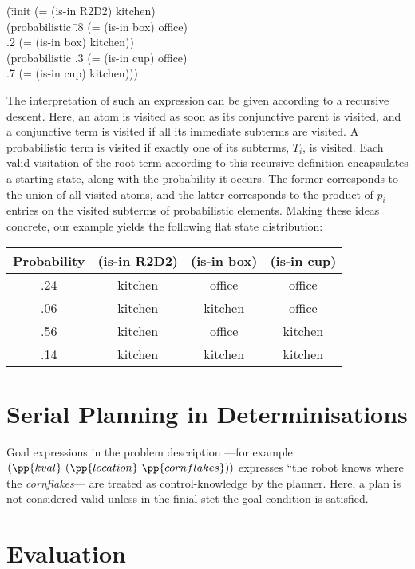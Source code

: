 \documentclass[letterpaper]{article}
\begin{document}
\small{
\begin{tabtt}
(\=:init (= (is-in R2D2) kitchen) \+ \\
       (probabilistic \=.8 (= (is-in box) office)  \\
		      \>.2 (= (is-in box) kitchen)) \\
       (probabilistic .3 (= (is-in cup) office)  \\
		      \>.7 (= (is-in cup) kitchen))) \\
\end{tabtt}
}

\noindent The interpretation of such an expression can be given
according to a recursive descent. Here, an atom is visited as soon as
its conjunctive parent is visited, and a conjunctive term is visited
if all its immediate subterms are visited. A probabilistic term is
visited if exactly one of its subterms, $T_i$, is visited. Each valid
visitation of the root term according to this recursive definition
encapsulates a starting state, along with the probability it
occurs. The former corresponds to the union of all visited atoms, and
the latter corresponds to the product of $p_i$ entries on the visited
subterms of probabilistic elements. Making these ideas concrete, our
example yields the following flat state distribution:


\begin{tabular}{cccc}
\hline
Probability & (is-in R2D2)  & (is-in box)  & (is-in cup) \\
\hline
.24 & kitchen & office & office \\
.06 & kitchen & kitchen & office \\
.56 & kitchen & office & kitchen \\
.14 & kitchen & kitchen & kitchen \\
\hline
\end{tabular}




\section{Serial Planning in Determinisations}

Goal expressions in the problem description ---for example
$(\pp{kval}~(\pp{location}~\pp{cornflakes}))$ expresses ``the robot
knows where the {\em cornflakes}--- are treated as control-knowledge
by the planner. Here, a plan is not considered valid unless in the
finial stet the goal condition is satisfied.


\section{Evaluation}
\end{document}

